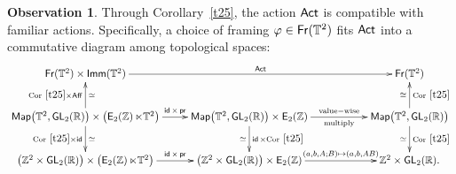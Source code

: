 \documentclass{amsart}
\theoremstyle{definition}
\newtheorem{observation}[theorem]{Observation}
\newtheorem{remark}[theorem]{Remark}
\theoremstyle{remark}
\DeclareMathOperator{\pr}{\mathsf{pr}}
\DeclareMathOperator{\Map}{{\sf Map}}
\def\sE{\mathsf E}\def\sF{\mathsf F}\def\sG{\mathsf G}\def\sH{\mathsf H}
\DeclareMathOperator{\GL}{\sf GL}
\DeclareMathOperator{\Fr}{\sf Fr}
\DeclareMathOperator{\id}{\sf id}
\DeclareMathOperator{\Act}{\sf Act}
\DeclareMathOperator{\Imm}{\sf Imm}
\DeclareMathOperator{\Aff}{\sf Aff}
\DeclareMathOperator{\EZ}{\sE_2(\ZZ)}
\begin{document}
%


\begin{observation}\label{t4}
Through Corollary~\ref{t25}, the action $\Act$ is compatible with familiar actions.
Specifically, a choice of framing $\varphi \in \Fr(\TT^2)$ fits $\Act$ into a commutative diagram among topological spaces:
\begin{equation*}%
\xymatrix{
\Fr(\TT^2)
\times
\Imm(\TT^2)
\ar[rrr]^-{\Act}
&
&&
\Fr(\TT^2)
\\
\Map\bigl( \TT^2 , \GL_2(\RR) \bigr)
\times
\bigl(
\EZ \ltimes \TT^2 
\bigr)
\ar[u]^-{ {\rm Cor}~\ref{t25} \times \Aff}_-{\simeq}
\ar[r]^-{ \id \times \pr }
\ar[d]_-{ {\rm Cor}~\ref{t25} \times \id}^-{\simeq}
&
\Map\bigl( \TT^2 , \GL_2(\RR) \bigr)
\times
\EZ 
\ar[rr]^-{\rm value-wise}_-{\rm multiply}
\ar[d]^-{\id \times {\rm Cor}~\ref{t25}}_-{\simeq}
&&
\Map\bigl( \TT^2 , \GL_2(\RR) \bigr)
\ar[d]^-{{\rm Cor}~\ref{t25}}_-{\simeq}
\ar[u]_-{{\rm Cor}~\ref{t25}}^-{\cong}
\\
\bigl( \ZZ^2 \times \GL_2(\RR) \bigr)
\times
\bigl(
\EZ \ltimes \TT^2 
\bigr)
\ar[r]^-{ \id \times \pr }
&
\bigl( \ZZ^2\times  \GL_2(\RR) \bigr)
\times
\EZ 
\ar[rr]^-{(a,b,A;B)\mapsto (a,b,AB)}
&&
\ZZ^2 \times \GL_2(\RR) 
.
}
\end{equation*}


\end{observation}
\end{document}
